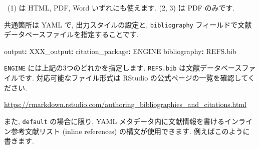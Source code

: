 \documentclass[
]{bxjsarticle}
\newenvironment{Shaded}{\begin{snugshade}}{\end{snugshade}}
\newcommand{\AttributeTok}[1]{\textcolor[rgb]{0.77,0.63,0.00}{#1}}
\newcommand{\FunctionTok}[1]{\textcolor[rgb]{0.00,0.00,0.00}{#1}}
\newcommand{\KeywordTok}[1]{\textcolor[rgb]{0.13,0.29,0.53}{\textbf{#1}}}
\begin{document}
~(1) は HTML, PDF, Word いずれにも使えます. (2, 3) は PDF のみです.

共通箇所は YAML で, 出力スタイルの設定と, \texttt{bibliography} フィールドで文献データベースファイルを指定することです.

\begin{Shaded}
\begin{Highlighting}[numbers=left,,]
\FunctionTok{output}\KeywordTok{:}
\AttributeTok{    }\FunctionTok{XXX\_output}\KeywordTok{:}
\AttributeTok{      }\FunctionTok{citation\_package}\KeywordTok{:}\AttributeTok{ ENGINE}
\FunctionTok{bibliography}\KeywordTok{:}\AttributeTok{ REFS.bib}
\end{Highlighting}
\end{Shaded}

\texttt{ENGINE} には上記の3つのどれかを指定します. \texttt{REFS.bib} は文献データベースファイルです. 対応可能なファイル形式は RStudio の公式ページの一覧を確認してください.

\url{https://rmarkdown.rstudio.com/authoring_bibliographies_and_citations.html}

また, \texttt{default} の場合に限り, YAML メタデータ内に文献情報を書けるインライン参考文献リスト (inline references) の構文が使用できます. 例えばこのように書きます.
\end{document}
